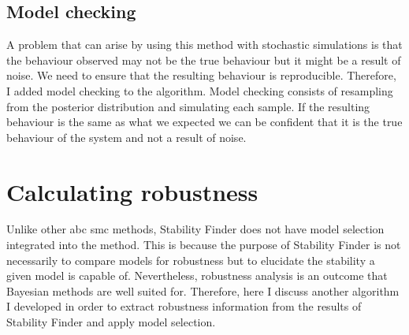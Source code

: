 %
%	
%    

\subsection{Model checking}
\label{sec:mod_check}
A problem that can arise by using this method with stochastic simulations is that the behaviour observed may not be the true behaviour but it might be a result of noise. We need to ensure that the resulting behaviour is reproducible. Therefore, I added model checking to the algorithm. Model checking consists of resampling from the posterior distribution and simulating each sample. If the resulting behaviour is the same as what we expected we can be confident that it is the true behaviour of the system and not a result of noise. 


\section{Calculating robustness}
\label{sec:cal_rob}
Unlike other \acrshort{abc} \acrshort{smc} methods, Stability Finder does not have model selection integrated into the method. This is because the purpose of Stability Finder is not necessarily to compare models for robustness but to elucidate the stability a given model is capable of. Nevertheless, robustness analysis is an outcome that Bayesian methods are well suited for. Therefore, here I discuss another algorithm I developed in order to extract robustness information from the results of Stability Finder and apply model selection.  

